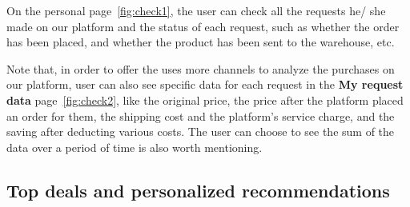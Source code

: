 On the personal page~\ref{fig:check1}, the user can check all the requests he/ she made on our platform and the status of each request, such as whether the order has been placed, and whether the product has been sent to the warehouse, etc.

Note that, in order to offer the uses more channels to analyze the purchases on our platform, user can also see specific data for each request in the \textbf{My request data} page~\ref{fig:check2}, like the original price, the price after the platform placed an order for them, the shipping cost and the platform's service charge, and the saving after deducting various costs. The user can choose to see the sum of the data over a period of time is also worth mentioning.

\subsection{Top deals and personalized recommendations}

